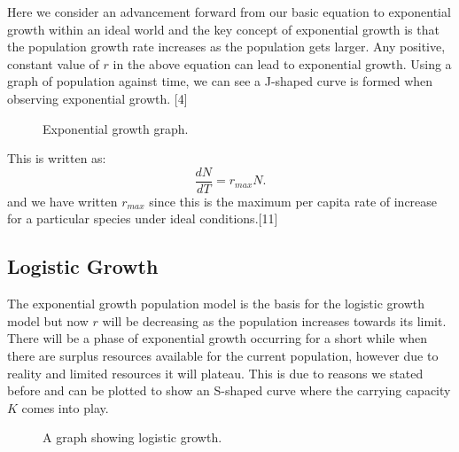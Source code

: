 \documentclass{article}
\begin{document}
Here we consider an advancement forward from our basic equation to exponential growth within an ideal world and the key concept of exponential growth is that the population growth rate increases as the population gets larger. Any positive, constant value of $r$ in the above equation can lead to exponential growth. Using a graph of population against time, we can see a J-shaped curve is formed when observing exponential growth. [4]

\begin{figure}[H]
\begin{center}
\caption{Exponential growth graph.}
\end{center}
\end{figure}

This is written as:
$$\frac{dN}{dT}= r_{max}N.$$
and we have written $r_{max}$ since this is the maximum per capita rate of increase for a particular species under ideal conditions.[11]


\subsection{\textbf{Logistic Growth}}

The exponential growth population model is the basis for the logistic growth model but now $r$ will be decreasing as the population increases towards its limit. There will be a phase of exponential growth occurring for a short while when there are surplus resources available for the current population, however due to reality and limited resources it will plateau. This is due to reasons we stated before and can be plotted to show an S-shaped curve where the carrying capacity $K$ comes into play.

\begin{figure}[H]
\begin{center}
\caption{A graph showing logistic growth.}
\end{center}
\end{figure}
\end{document}
